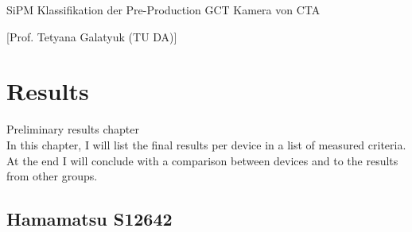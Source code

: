 \documentclass[article,type=msc,colorback,accentcolor=tud9c]{tudthesis}
\begin{document}
{SiPM Klassifikation der Pre-Production GCT Kamera von CTA}
\author{Ben Gebhardt}
[Prof. Tetyana Galatyuk (TU DA)]
\dateofexam{\today}{\today}
\makethesistitle
{}

\section{Results}
Preliminary results chapter\\
In this chapter, I will list the final results per device in a list of measured criteria. At the end I will conclude with a comparison between devices and to the results from other groups.

    \subsection{Hamamatsu S12642}
    
\end{document}

